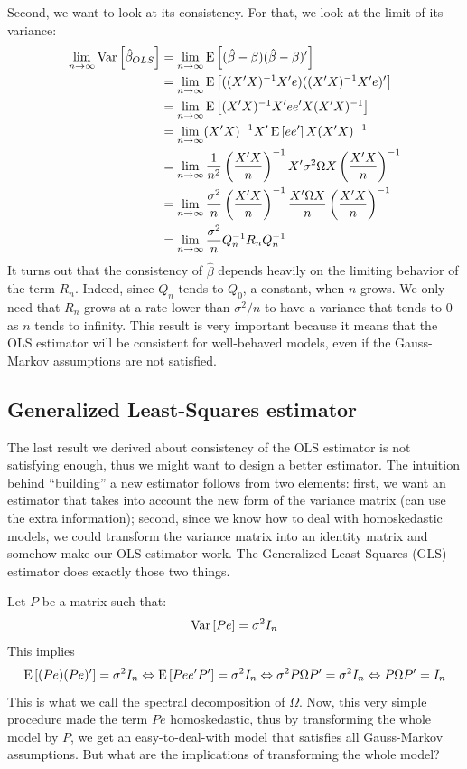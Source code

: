 Second, we want to look at its consistency. For that, we look at the limit of its variance: \begin{align*}
\lim_{n\to\infty} \operatorname{Var}\left[\hat{\beta}_{OLS}\right] & = \lim_{n\to\infty}\operatorname{E}\left[(\hat\beta - \beta)(\hat\beta - \beta)'\right] \\ & = \lim_{n\to\infty}\operatorname{E}\left[((X'X)^{-1}X'e)((X'X)^{-1}X'e)'\right] \\ 
& = \lim_{n\to\infty}\operatorname{E}\left[(X'X)^{-1}X'ee'X(X'X)^{-1}\right] \\ & = \lim_{n\to\infty}(X'X)^{-1}X'\operatorname{E}\left[ee'\right]X(X'X)^{-1} \\ 
& = \lim_{n\to\infty}\frac{1}{n^2}\left(\frac{X'X}{n}\right)^{-1}X'\sigma^2\Omega X\left( \frac{X'X}{n}\right)^{-1} \\ 
& = \lim_{n\to\infty}\frac{\sigma^2}{n}\left(\frac{X'X}{n}\right)^{-1}\frac{X'\Omega X}{n}\left(\frac{X'X}{n}\right)^{-1} \\ 
& = \lim_{n\to\infty}\frac{\sigma^2}{n}Q_n^{-1}R_n Q_n^{-1}
\end{align*} It turns out that the consistency of $\hat\beta$ depends heavily on the limiting behavior of the term $R_n$. Indeed, since $Q_n$ tends to $Q_0$, a constant, when $n$ grows. We only need that $R_n$ grows at a rate lower than $\sigma^2/n$ to have a variance that tends to $0$ as $n$ tends to infinity. This result is very important because it means that the OLS estimator will be consistent for well-behaved models, even if the Gauss-Markov assumptions are not satisfied.

\subsection{Generalized Least-Squares estimator}

The last result we derived about consistency of the OLS estimator is not satisfying enough, thus we might want to design a better estimator. The intuition behind ``building'' a new estimator follows from two elements: first, we want an estimator that takes into account the new form of the variance matrix (can use the extra information); second, since we know how to deal with homoskedastic models, we could transform the variance matrix into an identity matrix and somehow make our OLS estimator work. The Generalized Least-Squares (GLS) estimator does exactly those two things.

Let $P$ be a matrix such that: $$\operatorname{Var}\left[Pe\right] = \sigma^2I_n $$ This implies $$\operatorname{E}\left[(Pe)(Pe)'\right] = \sigma^2I_n \Leftrightarrow \operatorname{E}\left[Pee'P'\right] = \sigma^2 I_n \Leftrightarrow \sigma^2P\Omega P' = \sigma^2 I_n \Leftrightarrow P\Omega P' = I_n$$ This is what we call the spectral decomposition of $\Omega$. Now, this very simple procedure made the term $Pe$ homoskedastic, thus by transforming the whole model by $P$, we get an easy-to-deal-with model that satisfies all Gauss-Markov assumptions. But what are the implications of transforming the whole model?

